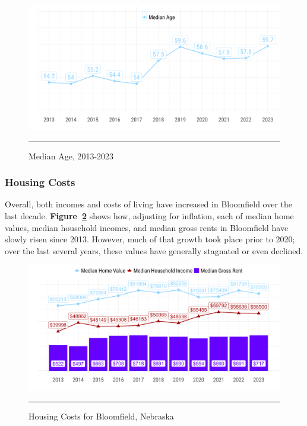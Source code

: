 \begin{figure}[H]
\centering
\begin{framed}
    \caption{Median Age, 2013-2023}
    \label{fig:medianAge}
    \includegraphics[width=\linewidth]{figures/median_age.png}
    \rule[-5pt]{\linewidth}{0.4pt}
\end{framed}
\end{figure}

\pagebreak
\subsubsection*{Housing Costs}

\noindent Overall, both incomes and costs of living have increased in Bloomfield over the last decade. \textbf{Figure~\ref{fig:housingCosts}} shows how, adjusting for inflation, each of median home values, median household incomes, and median gross rents in Bloomfield have slowly risen since 2013. However, much of that growth took place prior to 2020; over the last several years, these values have generally stagnated or even declined.

\begin{figure}[H]
\centering
\begin{framed}
    \caption{Housing Costs for Bloomfield, Nebraska}
    \label{fig:housingCosts}
    \includegraphics[width=\linewidth]{figures/housing_costs.png}
    \rule[-5pt]{\linewidth}{0.4pt}
\end{framed}
\end{figure}

